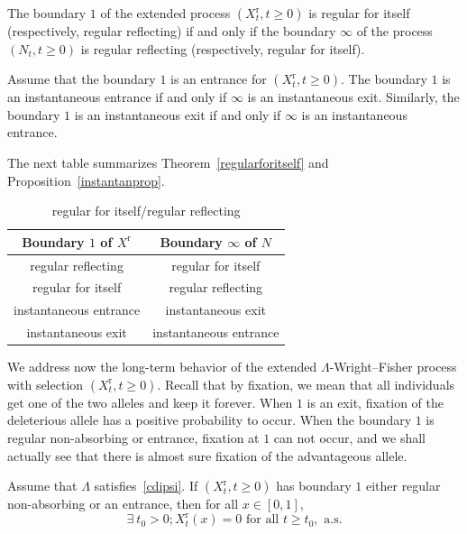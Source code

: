 \documentclass[AHL,Unicode,longabstracts,published]{cedram}
\newcommand{\rmr}{\mathrm{r}}
\let\oldexists\exists
\renewcommand*{\exists}{\mathrel{\oldexists}}
\begin{document}
\begin{theo}\label{regularforitself}
The boundary $1$ of the extended process $(X_t^{\rmr},t\geq 0)$ is regular for itself (respectively, regular reflecting) if and only if the boundary $\infty$ of the process $(N_t,t\geq 0) $ is regular reflecting (respectively, regular for itself).
\end{theo}

\begin{prop}\label{instantanprop}
Assume that the boundary $1$ is an entrance for $(X_t^{\rmr},t\geq 0)$. The boundary $1$ is an instantaneous entrance if and only if $\infty$ is an instantaneous exit. Similarly, the boundary $1$ is an instantaneous exit if and only if $\infty$ is an instantaneous entrance.
\end{prop}

The next table summarizes Theorem~\ref{regularforitself} and Proposition~\ref{instantanprop}.
\begin{table}[htpb]
\caption{regular for itself/regular reflecting}\label{correspondancereg}
\begin{center}
\begin{tabular}{|c|c|}
\hline Boundary $1$ of $X^{\rmr}$ & Boundary $\infty$ of $N$ \\
\hline regular reflecting & regular for itself\\
\hline regular for itself & regular reflecting \\
\hline instantaneous entrance & instantaneous exit \\
\hline instantaneous exit & instantaneous entrance \\
\hline
\end{tabular}
\vspace*{2mm}
\end{center}
\end{table}

We address now the long-term behavior of the extended $\Lambda$-Wright--Fisher process with selection $(X^{\rmr}_t,t\geq 0)$. Recall that by fixation, we mean that all individuals get one of the two alleles and keep it forever. When $1$ is an exit, fixation of the deleterious allele has a positive probability to occur. When the boundary $1$ is regular non-absorbing or entrance, fixation at $1$ can not occur, and we shall actually see that there is almost sure fixation of the advantageous allele.

\begin{theo}\label{fixationat0}
Assume that $\Lambda$ satisfies~\eqref{cdipsi}. If $(X_t^{\rmr},t\geq 0)$
has boundary $1$ either regular non-absorbing or an entrance, then for all $x\in [0,1]$,
\[
\exists \ t_0>0; X_t^{\rmr}(x)=0 \text{ for all } t\geq t_0, \text{ a.s.}
\]
\end{theo}
\end{document}
